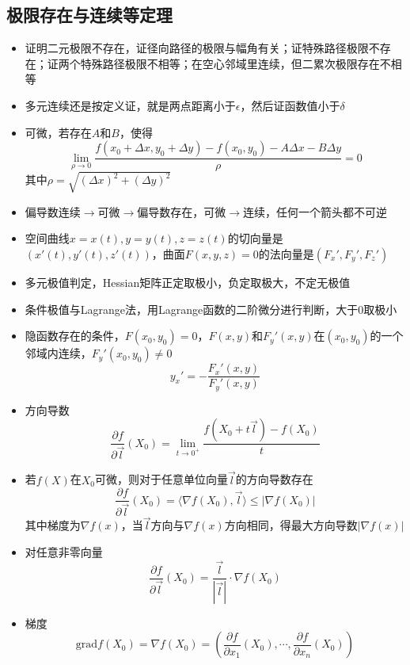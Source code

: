 \documentclass[UTF8]{ctexart}
\begin{document}
\subsection{极限存在与连续等定理}
\begin{itemize}
\item 证明二元极限不存在，证径向路径的极限与幅角有关；证特殊路径极限不存在；证两个特殊路径极限不相等；在空心邻域里连续，但二累次极限存在不相等

\item 多元连续还是按定义证，就是两点距离小于$\epsilon$，然后证函数值小于$\delta$

\item 可微，若存在$A$和$B$，使得
\[
\lim_{\rho\to 0}\frac{f(x_0+\Delta x,y_0+\Delta y)-f(x_0,y_0) - A\Delta x - B\Delta y}{\rho} =0
\]
其中$\rho=\sqrt{(\Delta x)^2+(\Delta y)^2}$

\item 偏导数连续$\rightarrow$可微$\rightarrow$偏导数存在，可微$\rightarrow$连续，任何一个箭头都不可逆

\item 空间曲线$x=x(t),y=y(t),z=z(t)$的切向量是$(x'(t),y'(t),z'(t))$，曲面$F(x,y,z)=0$的法向量是$(F_x',F_y',F_z')$

\item 多元极值判定，Hessian矩阵正定取极小，负定取极大，不定无极值

\item 条件极值与Lagrange法，用Lagrange函数的二阶微分进行判断，大于0取极小

\item 隐函数存在的条件，$F(x_0,y_0)=0$，$F(x,y)$和$F_y'(x,y)$在$(x_0,y_0)$的一个邻域内连续，$F_y'(x_0,y_0)\neq 0$
\[
y_x'=-\frac{F_x'(x,y)}{F_y'(x,y)}
\]


\item 方向导数
\[
\frac{\partial f}{\partial \vec{l}}(X_0) = \lim_{t\to 0^+} \frac{f(X_0 +t\vec{l}) -f(X_0)}{t}
\]


\item 若$f(X)$在$X_0$可微，则对于任意单位向量$\vec{l}$的方向导数存在
\[
\frac{\partial f}{\partial \vec{l}}(X_0) = \langle\nabla f(X_0),\vec{l} \rangle \leq |\nabla f(X_0)|
\]
其中梯度为$\nabla f(x)$，当$\vec{l}$方向与$\nabla f(x)$方向相同，得最大方向导数$|\nabla f(x)|$


\item 对任意非零向量
\[
\frac{\partial f}{\partial \vec{l}}(X_0) = \frac{\vec{l}}{|\vec{l}|} \cdot \nabla f(X_0)
\]

\item 梯度
\[
\text{grad}f(X_0) = \nabla f(X_0) = \left(\frac{\partial f}{\partial x_1}(X_0),\cdots,\frac{\partial f}{\partial x_n}(X_0) \right)
\]


\end{itemize}
\end{document}

